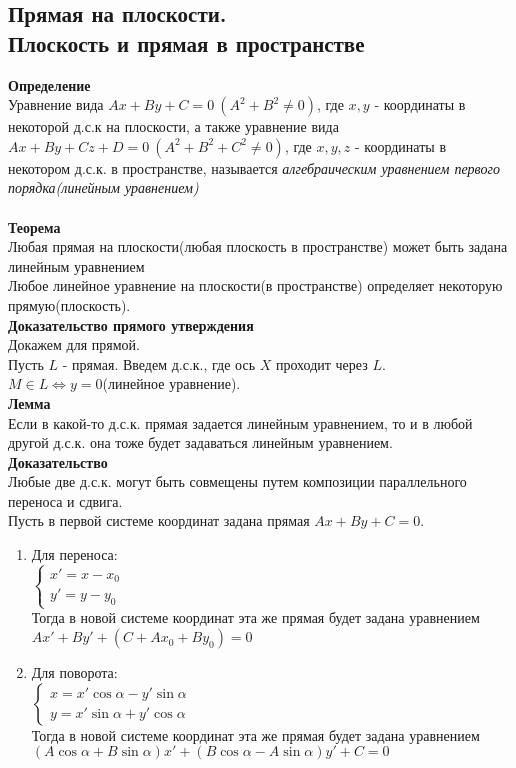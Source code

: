 \documentclass[12pt]{article}
\begin{document}
\subsection{Прямая на плоскости.\\Плоскость и прямая в пространстве}
\textbf{Определение}\\
Уравнение вида $Ax+By+C=0\ (A^2+B^2\neq 0)$, где $x,y$ - координаты в некоторой д.с.к на плоскости, а также уравнение вида $Ax+By+Cz+D=0\ (A^2+B^2+C^2\neq0)$, где $x,y,z$ - координаты в некотором д.с.к. в пространстве, называется \textit{алгебраическим уравнением первого порядка(линейным уравнением)}\\\\
\textbf{Теорема}\\
Любая прямая на плоскости(любая плоскость в пространстве) может быть задана линейным уравнением\\
Любое линейное уравнение на плоскости(в пространстве) определяет некоторую прямую(плоскость).\\
\textbf{Доказательство прямого утверждения}\\
Докажем для прямой.\\
Пусть $L$ - прямая. Введем д.с.к., где ось $X$ проходит через $L$.\\
$M \in L \Leftrightarrow y = 0$(линейное уравнение).\\
\textbf{Лемма}\\
Если в какой-то д.с.к. прямая задается линейным уравнением, то и в любой другой д.с.к. она тоже будет задаваться линейным уравнением.\\
\textbf{Доказательство}\\
Любые две д.с.к. могут быть совмещены путем композиции параллельного переноса и сдвига. \\
Пусть в первой системе координат задана прямая $Ax+By+C=0$.
\begin{enumerate}
    \item Для переноса:\\
$\left\{\begin{array}{l}
    x'=x-x_0  \\
    y'=y-y_0 
\end{array}\right.$\\
Тогда в новой системе координат эта же прямая будет задана уравнением $Ax'+By'+(C+Ax_0+By_0)=0$
\item Для поворота:\\
$\left\{\begin{array}{l}
    x=x'\cos\alpha-y'\sin\alpha\\
    y=x'\sin\alpha+y'\cos\alpha 
\end{array}\right.$\\
Тогда в новой системе координат эта же прямая будет задана уравнением $(A\cos\alpha+B\sin\alpha)x'+(B\cos\alpha-A\sin\alpha)y'+C=0$
\end{enumerate}
\end{document}
